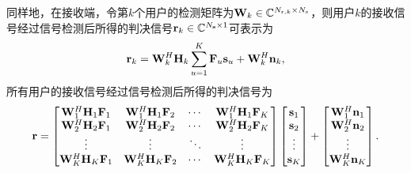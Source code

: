 同样地，在接收端，令第${k}$个用户的检测矩阵为${{\bf{W}}_k} \in {\mathbb{C}^{{N_{{\rm{r}},k}} \times {N_{\rm{s}}}}}$，则用户${k}$的接收信号经过信号检测后所得的判决信号${{\bf{r}}_k} \in {\mathbb{C}^{{N_{\bf{s}}} \times 1}}$可表示为
\begin{equation}\label{chap2:eq33}
  {{\bf{r}}_k} = {\bf{W}}_k^H{{\bf{H}}_k}\sum\limits_{u = 1}^K {{{\bf{F}}_u}{{\bf{s}}_u}}  + {\bf{W}}_k^H{{\bf{n}}_k},
\end{equation}
所有用户的接收信号经过信号检测后所得的判决信号为
\begin{equation}\label{chap2:eq34}
  {\bf{r}} = \begin{bmatrix}
                {{\bf{W}}_1^H{{\bf{H}}_1}{{\bf{F}}_1}}&{{\bf{W}}_1^H{{\bf{H}}_1}{{\bf{F}}_2}}& \cdots &{{\bf{W}}_1^H{{\bf{H}}_1}{{\bf{F}}_K}}\\
                {{\bf{W}}_2^H{{\bf{H}}_2}{{\bf{F}}_1}}&{{\bf{W}}_2^H{{\bf{H}}_2}{{\bf{F}}_2}}& \cdots &{{\bf{W}}_2^H{{\bf{H}}_2}{{\bf{F}}_K}}\\
                 \vdots & \vdots & \ddots & \vdots \\
                {{\bf{W}}_K^H{{\bf{H}}_K}{{\bf{F}}_1}}&{{\bf{W}}_K^H{{\bf{H}}_K}{{\bf{F}}_2}}& \cdots &{{\bf{W}}_K^H{{\bf{H}}_K}{{\bf{F}}_K}}
             \end{bmatrix}
             \begin{bmatrix}
                {{{\bf{s}}_1}}\\
                {{{\bf{s}}_2}}\\
                 \vdots \\
                {{{\bf{s}}_K}}
             \end{bmatrix} +
             \begin{bmatrix}
                {{\bf{W}}_1^H{{\bf{n}}_1}}\\
                {{\bf{W}}_2^H{{\bf{n}}_2}}\\
                 \vdots \\
                {{\bf{W}}_K^H{{\bf{n}}_K}}
             \end{bmatrix}.
\end{equation}

